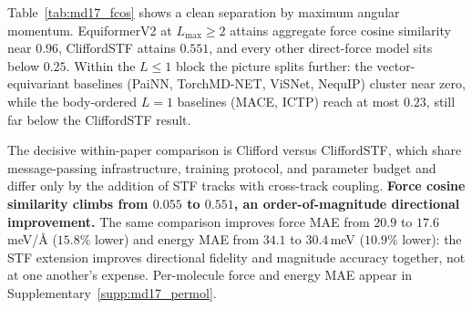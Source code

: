 Table~\ref{tab:md17_fcos} shows a clean separation by maximum angular momentum. EquiformerV2 at $L_{\max}\!\geq\!2$ attains aggregate force cosine similarity near $0.96$, CliffordSTF attains $0.551$, and every other direct-force model sits below $0.25$. Within the $L\!\leq\!1$ block the picture splits further: the vector-equivariant baselines (PaiNN, TorchMD-NET, ViSNet, NequIP) cluster near zero, while the body-ordered $L{=}1$ baselines (MACE, ICTP) reach at most $0.23$, still far below the CliffordSTF result.

The decisive within-paper comparison is Clifford versus CliffordSTF, which share message-passing infrastructure, training protocol, and parameter budget and differ only by the addition of STF tracks with cross-track coupling. \textbf{Force cosine similarity climbs from $0.055$ to $0.551$, an order-of-magnitude directional improvement.} The same comparison improves force MAE from $20.9$ to $17.6$\,meV/\AA{} ($15.8\%$ lower) and energy MAE from $34.1$ to $30.4$\,meV ($10.9\%$ lower): the STF extension improves directional fidelity and magnitude accuracy together, not at one another's expense. Per-molecule force and energy MAE appear in Supplementary~\ref{supp:md17_permol}.

